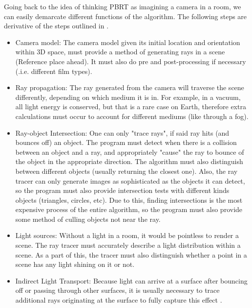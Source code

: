 \documentclass[../main.tex]{subfiles}
\begin{document}
Going back to the idea of thinking PBRT as imagining a camera in a room, we can easily demarcate different functions of the algorithm.
The following steps are derivative of the steps outlined in \cite{pharrPhysicallyBasedRendering2016}.
\begin{itemize}
  \item Camera model: The camera model given its initial location and orientation within 3D space, must provide a method of generating rays in a scene (Reference place ahead). It must also do pre and post-processing if necessary (.i.e. different film types).
  \item Ray propagation: The ray generated from the camera will traverse the scene differently, depending on which medium it is in. For example, in a vacuum, all light energy is conserved, but that is a rare case on Earth, therefore extra calculations must occur to account for different mediums (like through a fog).
  \item Ray-object Intersection: One can only "trace rays", if said ray hits (and bounces off) an object. The program must detect when there is a collision between an object and a ray, and appropriately "cause" the ray to bounce of the object in the appropriate direction.
    The algorithm must also distinguish between different objects (usually returning the closest one). Also, the ray tracer can only generate images as sophisticated as the objects it can detect, so the program must also provide intersection tests with different kinds objects (triangles, circles, etc). Due to this, finding intersections is the most expensive process of the entire algorithm, so the program must also provide some method of culling objects not near the ray.
  \item Light sources: Without a light in a room, it would be pointless to render a scene. The ray tracer must accurately describe a light distribution within a scene. As a part of this, the tracer must also distinguish whether a point in a scene has any light shining on it or not.
  \item Indirect Light Transport: Because light can arrive at a surface after bouncing off or passing through other surfaces, it is usually necessary to trace additional rays originating at the surface to fully capture this effect \cite{pharrPhysicallyBasedRendering2016}. 
\end{itemize}

\end{document}
